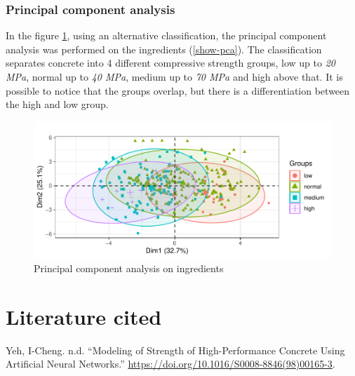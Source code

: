 \documentclass[]{article}
\begin{document}
\hypertarget{principal-component-analysis}{%
\subsubsection{Principal component
analysis}\label{principal-component-analysis}}

In the figure \ref{fig:pca}, using an alternative classification, the
principal component analysis was performed on the ingredients
(\ref{show-pca}). The classification separates concrete into 4 different
compressive strength groups, low up to \emph{20 MPa}, normal up to
\emph{40 MPa}, medium up to \emph{70 MPa} and high above that. It is
possible to notice that the groups overlap, but there is a
differentiation between the high and low group.

\begin{figure}

{\centering \includegraphics{CopyOfcapstone_files/figure-latex/pca-1} 

}

\caption{Principal component analysis on ingredients}\label{fig:pca}
\end{figure}

\hypertarget{literature-cited}{%
\section{Literature cited}\label{literature-cited}}

\hypertarget{refs}{}
\leavevmode\hypertarget{ref-Yeh1998}{}%
Yeh, I-Cheng. n.d. ``Modeling of Strength of High-Performance Concrete
Using Artificial Neural Networks.''
\url{https://doi.org/10.1016/S0008-8846(98)00165-3}.
\end{document}

